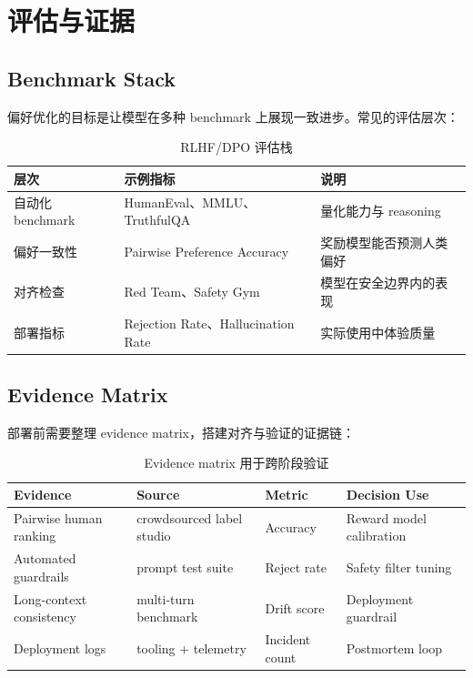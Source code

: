\section{评估与证据}

\subsection{Benchmark Stack}

偏好优化的目标是让模型在多种 benchmark 上展现一致进步。常见的评估层次：

\begin{table}[H]
\centering
\begin{tabular}{p{} p{} p{}}
\toprule
层次 & 示例指标 & 说明 \\
\midrule
自动化 benchmark & HumanEval、MMLU、TruthfulQA & 量化能力与 reasoning \\
偏好一致性 & Pairwise Preference Accuracy & 奖励模型能否预测人类偏好 \\
对齐检查 & Red Team、Safety Gym & 模型在安全边界内的表现 \\
部署指标 & Rejection Rate、Hallucination Rate & 实际使用中体验质量 \\
\bottomrule
\end{tabular}
\caption{RLHF/DPO 评估栈}
\end{table}

\subsection{Evidence Matrix}

部署前需要整理 evidence matrix，搭建对齐与验证的证据链：

\begin{table}[H]
\centering
\begin{tabular}{p{} p{} p{} p{}}
\toprule
Evidence & Source & Metric & Decision Use \\
\midrule
Pairwise human ranking & crowdsourced label studio & Accuracy & Reward model calibration \\
Automated guardrails & prompt test suite & Reject rate & Safety filter tuning \\
Long-context consistency & multi-turn benchmark & Drift score & Deployment guardrail \\
Deployment logs & tooling + telemetry & Incident count & Postmortem loop \\
\bottomrule
\end{tabular}
\caption{Evidence matrix 用于跨阶段验证}
\end{table}

